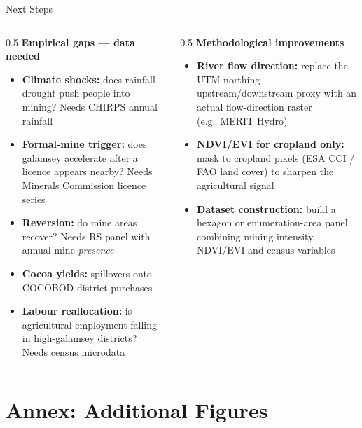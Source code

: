 \documentclass[aspectratio=169,handout]{beamer}
\begin{document}
\begin{frame}{Next Steps}
  \begin{columns}[T]
    \begin{column}{0.5\textwidth}
      \textbf{Empirical gaps --- data needed}
      \begin{itemize}\small\setlength\itemsep{0.35em}
        \item \textbf{Climate shocks:} does rainfall drought push people into
              mining? Needs CHIRPS annual rainfall
        \item \textbf{Formal-mine trigger:} does galamsey accelerate after a
              licence appears nearby? Needs Minerals Commission licence series
        \item \textbf{Reversion:} do mine areas recover? Needs RS panel with
              annual mine \emph{presence}
        \item \textbf{Cocoa yields:} spillovers onto COCOBOD district purchases
        \item \textbf{Labour reallocation:} is agricultural employment falling
              in high-galamsey districts? Needs census microdata
      \end{itemize}
    \end{column}
    \begin{column}{0.5\textwidth}
      \textbf{Methodological improvements}
      \begin{itemize}\small\setlength\itemsep{0.35em}
        \item \textbf{River flow direction:} replace the UTM-northing
              upstream/downstream proxy with an actual flow-direction raster
              (e.g.\ MERIT Hydro)
        \item \textbf{NDVI/EVI for cropland only:} mask to cropland pixels
              (ESA CCI / FAO land cover) to sharpen the agricultural signal
        \item \textbf{Dataset construction:} build a hexagon or
              enumeration-area panel combining mining intensity, NDVI/EVI and
              census variables
      \end{itemize}
    \end{column}
  \end{columns}
\end{frame}

\appendix
\section{Annex: Additional Figures}
\end{document}

